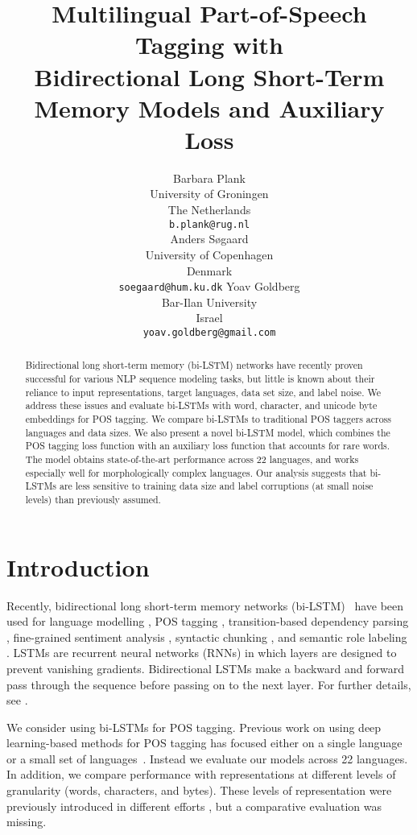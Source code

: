 \documentclass[11pt]{article}
\title{Multilingual Part-of-Speech Tagging with\\Bidirectional Long Short-Term Memory Models and Auxiliary Loss}
\author{Barbara Plank \\ University of Groningen \\ The Netherlands\\ {\tt b.plank@rug.nl}\\
         \And  Anders S\o{}gaard\\University of Copenhagen\\Denmark \\ {\tt soegaard@hum.ku.dk} \hspace*{0.2cm}
         \And Yoav Goldberg\\Bar-Ilan University\\Israel\\ {\tt yoav.goldberg@gmail.com}
         }
\date{}
\begin{document}
\maketitle

\begin{abstract}
Bidirectional long short-term memory (bi-LSTM) networks have recently proven successful for various NLP sequence modeling tasks, but little is known about their reliance to input representations, target languages, data set size, and label noise. 
We address these issues and evaluate bi-LSTMs with word, character, and unicode byte embeddings for POS tagging. We compare bi-LSTMs to traditional POS taggers across languages and data sizes. We also present a novel bi-LSTM model, which combines the POS tagging loss function with an auxiliary loss function that accounts for rare words. The model obtains state-of-the-art performance across 22 languages, and works especially well for morphologically complex languages. Our analysis suggests that bi-LSTMs are less sensitive to training data size and label corruptions (at small noise levels) than previously assumed. \end{abstract}

\section{Introduction}

Recently, bidirectional long short-term memory networks (bi-LSTM)~\cite{graves:schmidhuber:2005,Hochreiter:Schmidhuber:97} have been used for 
language modelling \cite{ling:ea:2015}, POS tagging \cite{ling:ea:2015,wang:ea:2015:arxiv}, transition-based dependency parsing \cite{ballesteros:ea:2015,kiperwasser:goldberg:2016}, fine-grained sentiment analysis \cite{Liu:ea:15}, syntactic chunking \cite{Huang:ea:15}, and semantic role labeling \cite{Zhou:Xu:15}. LSTMs are recurrent neural networks (RNNs) in which layers are designed to prevent vanishing gradients. Bidirectional LSTMs make a backward and forward pass through the sequence before passing on to the next layer. For further details, see \cite{goldberg-primer,cho-primer}.




We consider using bi-LSTMs for POS tagging. Previous work on using deep learning-based methods for POS tagging has focused either on a single language~\cite{Collobert:ea:2011natural,wang:ea:2015:arxiv} or a small set of languages~\cite{ling:ea:2015,santos:zadrozny:2014}. Instead we evaluate our models across 22 languages.
In addition, we compare performance with representations at different levels of granularity (words, characters, and bytes). 
These levels of representation were previously introduced 
in different efforts \cite{chrupala:2013,zhang:ea:2015:char,ling:ea:2015,santos:zadrozny:2014,gillick:ea:2016,kim2015character}, but a comparative evaluation was missing.
\end{document}
